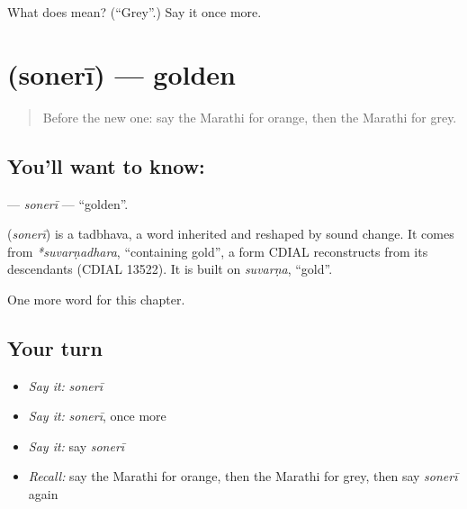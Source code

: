 \begin{tcolorbox}[breakable,colback=teal!4,colframe=teal!35!black,title={Before you move on}]
What does  mean? (\textquotedblleft{}Grey\textquotedblright{}.) Say it once more.
\end{tcolorbox}
\section[\texorpdfstring{\mr{सोनेरी} (sonerī)}{सोनेरी (sonerī)}]{ (sonerī) — golden}

\label{lesson:MR-C153-soneri}



\begin{quote}
Before the new one: say the Marathi for orange, then the Marathi for grey.
\end{quote}

\subsection*{You'll want to know: }
\textbf{} — \emph{sonerī} — \textquotedblleft{}golden\textquotedblright{}.

\begin{cousinweb}
\textbf{} (\emph{sonerī}) is a tadbhava, a word inherited and reshaped by sound change. It comes from \emph{*suvarṇadhara}, \textquotedblleft{}containing gold\textquotedblright{}, a form CDIAL reconstructs from its descendants (CDIAL 13522). It is built on \emph{suvarṇa}, \textquotedblleft{}gold\textquotedblright{}.
\end{cousinweb}

\begin{grammarlens}[title={What you've built}]
One more word for this chapter.
\end{grammarlens}

\subsection*{Your turn}
\begin{itemize}
\raggedright
  \item \emph{Say it:} \emph{sonerī}
  \item \emph{Say it:} \emph{sonerī}, once more
  \item \emph{Say it:} say \emph{sonerī}
  \item \emph{Recall:} say the Marathi for orange, then the Marathi for grey, then say \emph{sonerī} again
\end{itemize}

